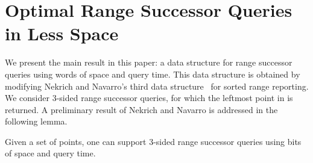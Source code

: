 \documentclass{llncs}
\begin{document}
\section{Optimal Range Successor Queries in Less Space}
\label{section_main}

We present the main result in this paper:
a data structure for range successor queries using  words of space and  query time.
This data structure is obtained by modifying Nekrich and Navarro's third data structure~\cite{DBLP:conf/swat/NekrichN12} for sorted range reporting.
We consider 3-sided range successor queries,
for which the leftmost point in  is returned.
A preliminary result of Nekrich and Navarro is addressed in the following lemma.
\begin{lemma}
    \label{lemma_three_sided}
    Given a set of  points, one can support 3-sided range successor queries
    using  bits of space and  query time.
\end{lemma}
\end{document}
